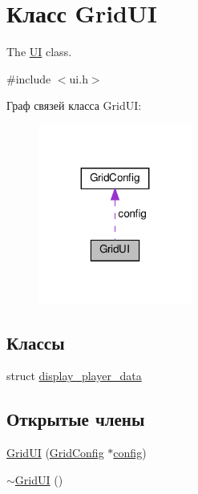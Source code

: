 \hypertarget{class_grid_u_i}{}\section{Класс Grid\+UI}
\label{class_grid_u_i}


The \hyperlink{class_u_i}{UI} class.  




{\ttfamily \#include $<$ui.\+h$>$}



Граф связей класса Grid\+UI\+:\nopagebreak
\begin{figure}[H]
\begin{center}
\leavevmode
\includegraphics[width=143pt]{class_grid_u_i__coll__graph}
\end{center}
\end{figure}
\subsection*{Классы}
\begin{DoxyCompactItemize}
\item 
struct \hyperlink{struct_grid_u_i_1_1display__player__data}{display\+\_\+player\+\_\+data}
\end{DoxyCompactItemize}
\subsection*{Открытые члены}
\begin{DoxyCompactItemize}
\item 
\hyperlink{class_grid_u_i_a3fb2c00058a899778812018dea387e24}{Grid\+UI} (\hyperlink{class_grid_config}{Grid\+Config} $\ast$\hyperlink{class_grid_u_i_aa25b4477bce884bea5e53a1d8df61bd6}{config})
\item 
\hyperlink{class_grid_u_i_acc680397d82028287a7ba8e89598679f}{$\sim$\+Grid\+UI} ()
\end{DoxyCompactItemize}
